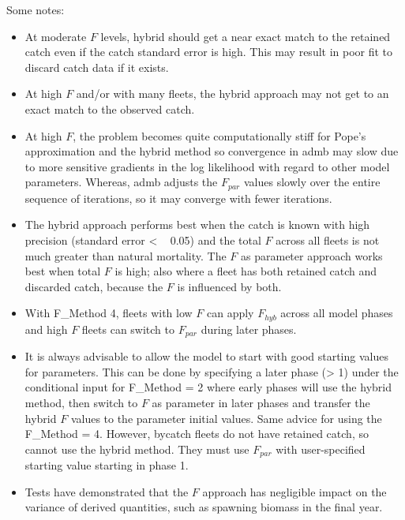 Some notes:
\begin{itemize}
	\item At moderate $F$ levels, hybrid should get a near exact match to the retained catch even if the catch standard error is high. This may result in poor fit to discard catch data if it exists.
	\item At high $F$ and/or with many fleets, the hybrid approach may not get to an exact match to the observed catch.
	\item At high $F$, the problem becomes quite computationally stiff for Pope's approximation and the hybrid method so convergence in \gls{admb} may slow due to more sensitive gradients in the log likelihood with regard to other model parameters. Whereas, \gls{admb} adjusts the $F_{par}$ values slowly over the entire sequence of iterations, so it may converge with fewer iterations.
	\item The hybrid approach performs best when the catch is known with high precision (standard error < ~ 0.05) and the total $F$ across all fleets is not much greater than natural mortality. The $F$ as parameter approach works best when total $F$ is high; also where a fleet has both retained catch and discarded catch, because the $F$ is influenced by both. 
	\item With F\_Method 4, fleets with low $F$ can apply $F_{hyb}$ across all model phases and high $F$ fleets can switch to $F_{par}$ during later phases.
	\item It is always advisable to allow the model to start with good starting values for parameters. This can be done by specifying a later phase (> 1) under the conditional input for F\_Method = 2 where early phases will use the hybrid method, then switch to $F$ as parameter in later phases and transfer the hybrid $F$ values to the parameter initial values. Same advice for using the F\_Method = 4. However, bycatch fleets do not have retained catch, so cannot use the hybrid method. They must use $F_{par}$ with user-specified starting value starting in phase 1.
	\item Tests have demonstrated that the $F$ approach has negligible impact on the variance of derived quantities, such as spawning biomass in the final year.

\end{itemize}
